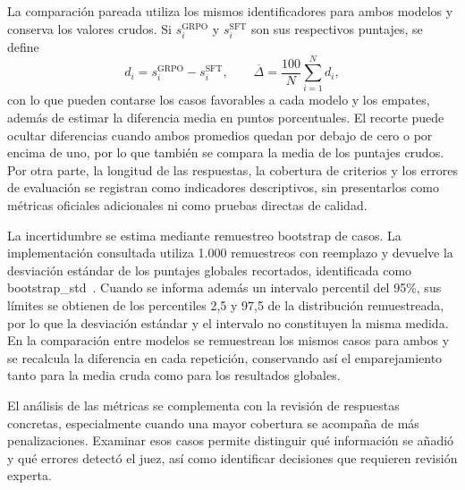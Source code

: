 La comparación pareada utiliza los mismos identificadores para ambos modelos y conserva los valores crudos. Si $s_i^{\mathrm{GRPO}}$ y $s_i^{\mathrm{SFT}}$ son sus respectivos puntajes, se define
\begin{equation}
d_i=s_i^{\mathrm{GRPO}}-s_i^{\mathrm{SFT}},
\qquad \overline{\Delta}=\frac{100}{N}\sum_{i=1}^{N}d_i,
\label{eq:healthbench-pareado}
\end{equation}
con lo que pueden contarse los casos favorables a cada modelo y los empates, además de estimar la diferencia media en puntos porcentuales. El recorte puede ocultar diferencias cuando ambos promedios quedan por debajo de cero o por encima de uno, por lo que también se compara la media de los puntajes crudos. Por otra parte, la longitud de las respuestas, la cobertura de criterios y los errores de evaluación se registran como indicadores descriptivos, sin presentarlos como métricas oficiales adicionales ni como pruebas directas de calidad.

La incertidumbre se estima mediante remuestreo bootstrap de casos. La implementación consultada utiliza 1.000 remuestreos con reemplazo y devuelve la desviación estándar de los puntajes globales recortados, identificada como bootstrap\_std~\cite{openai2026healthbenchcode}. Cuando se informa además un intervalo percentil del 95\%, sus límites se obtienen de los percentiles 2,5 y 97,5 de la distribución remuestreada, por lo que la desviación estándar y el intervalo no constituyen la misma medida. En la comparación entre modelos se remuestrean los mismos casos para ambos y se recalcula la diferencia en cada repetición, conservando así el emparejamiento tanto para la media cruda como para los resultados globales.

El análisis de las métricas se complementa con la revisión de respuestas concretas, especialmente cuando una mayor cobertura se acompaña de más penalizaciones. Examinar esos casos permite distinguir qué información se añadió y qué errores detectó el juez, así como identificar decisiones que requieren revisión experta.